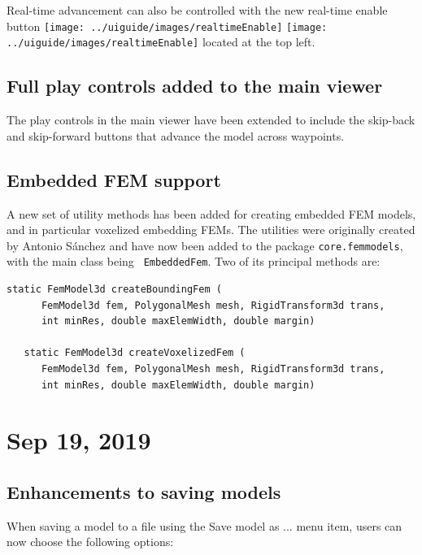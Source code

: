 \documentclass{article}
\begin{document}
Real-time advancement can also be controlled with the new {\sf
real-time enable} button
\iflatexml
\texttt{[image: ../uiguide/images/realtimeEnable]} 
\else
\texttt{[image: ../uiguide/images/realtimeEnable]} 
\fi
located at the top left.

\subsection*{Full play controls added to the main viewer}

The play controls in the main viewer have been extended to include the
skip-back and skip-forward buttons that advance the model across
waypoints.

\subsection*{Embedded FEM support}

A new set of utility methods has been added for creating embedded FEM
models, and in particular voxelized embedding FEMs. The utilities were
originally created by Antonio S\'{a}nchez and have now been added to the
package {\tt core.femmodels}, with the main class being {\tt
EmbeddedFem}. Two of its principal methods are:
%
\begin{lstlisting}[]
   static FemModel3d createBoundingFem (
      FemModel3d fem, PolygonalMesh mesh, RigidTransform3d trans, 
      int minRes, double maxElemWidth, double margin)

   static FemModel3d createVoxelizedFem (
      FemModel3d fem, PolygonalMesh mesh, RigidTransform3d trans, 
      int minRes, double maxElemWidth, double margin)
\end{lstlisting}
%

\section*{Sep 19, 2019}

\subsection*{Enhancements to saving models}

When saving a model to a file using the {\sf Save model as ...} menu
item, users can now choose the following options:
\end{document}
